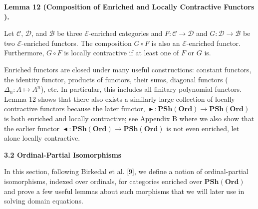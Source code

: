  
 
 
\par\medskip\noindent\textbf{Lemma 12 (Composition of Enriched and Locally Contractive Functors ).}\par
 
 
Let $\mathcal{C}$, $\mathcal{D}$, and $\mathcal{B}$ be three $\mathcal{E}$-enriched categories and $F:\mathcal{C}\to\mathcal{D}$ and $G:\mathcal{D}\to\mathcal{B}$ be two $\mathcal{E}$-enriched functors. The composition $G\circ F$ is also an $\mathcal{E}$-enriched functor. Furthermore, $G\circ F$ is locally contractive if at least one of $F$ or $G$ is.\par
 
 
 
 
Enriched functors are closed under many useful constructions: constant functors, the identity functor, products of functors, their sums, diagonal functors ($\Delta_{n}:A\mapsto A^{n}$), etc. In particular, this includes all finitary polynomial functors. Lemma 12 shows that there also exists a similarly large collection of locally contractive functors because the later functor, $\mathop{\blacktriangleright}:\mathbf{PSh}(\mathbf{Ord})\to\mathbf{PSh}(\mathbf{Ord})$ is both enriched and locally contractive; see Appendix B where we also show that the earlier functor $\mathop{\blacktriangleleft}:\mathbf{PSh}(\mathbf{Ord})\to\mathbf{PSh}(\mathbf{Ord})$ is not even enriched, let alone locally contractive.\par
 
 
 
 
\par\medskip\noindent\textbf{3.2 Ordinal-Partial Isomorphisms}\par
 
 
In this section, following Birkedal et al. [9], we define a notion of ordinal-partial isomorphisms, indexed over ordinals, for categories enriched over $\mathbf{PSh}(\mathbf{Ord})$ and prove a few useful lemmas about such morphisms that we will later use in solving domain equations.\par
 
